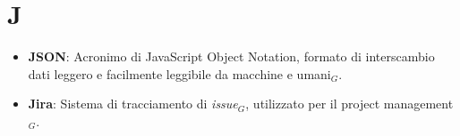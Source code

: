 \section{J}
\begin{itemize}
    \item \textbf{JSON}: Acronimo di JavaScript Object Notation, formato di interscambio dati leggero e facilmente leggibile da macchine e umani$_G$.
    \item \textbf{Jira}: Sistema di tracciamento di \textit{issue}$_G$, utilizzato per il project management$_G$.
\end{itemize}
